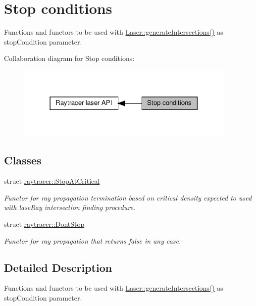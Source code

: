 \hypertarget{group__stopConditions}{}\section{Stop conditions}
\label{group__stopConditions}


Functions and functors to be used with \hyperlink{classraytracer_1_1Laser_a40fd2b112fb1de646861d7e93ac303e3}{Laser\+::generate\+Intersections()} as stop\+Condition parameter.  


Collaboration diagram for Stop conditions\+:
\nopagebreak
\begin{figure}[H]
\begin{center}
\leavevmode
\includegraphics[width=303pt]{group__stopConditions}
\end{center}
\end{figure}
\subsection*{Classes}
\begin{DoxyCompactItemize}
\item 
struct \hyperlink{structraytracer_1_1StopAtCritical}{raytracer\+::\+Stop\+At\+Critical}
\begin{DoxyCompactList}\small\item\em Functor for ray propagation termination based on critical density expected to used with lase\+Ray intersection finding procedure. \end{DoxyCompactList}\item 
struct \hyperlink{structraytracer_1_1DontStop}{raytracer\+::\+Dont\+Stop}
\begin{DoxyCompactList}\small\item\em Functor for ray propagation that returns false in any case. \end{DoxyCompactList}\end{DoxyCompactItemize}


\subsection{Detailed Description}
Functions and functors to be used with \hyperlink{classraytracer_1_1Laser_a40fd2b112fb1de646861d7e93ac303e3}{Laser\+::generate\+Intersections()} as stop\+Condition parameter. 

